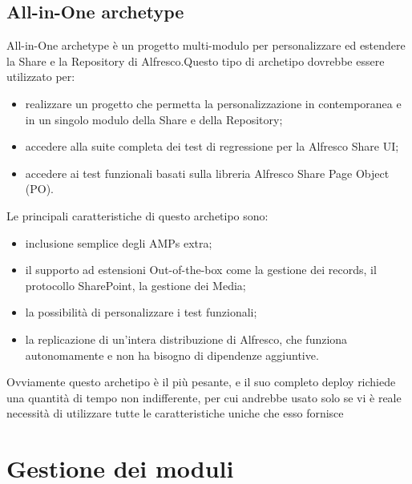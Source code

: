\subsection{All-in-One archetype}
All-in-One archetype è un progetto multi-modulo per personalizzare ed estendere la
Share e la Repository di Alfresco.Questo tipo di archetipo dovrebbe essere utilizzato per:
\begin{itemize}
\item realizzare un progetto che permetta la personalizzazione in contemporanea e in un singolo modulo della Share e della
Repository;
\item accedere alla suite completa dei test di regressione per la Alfresco Share UI;
\item accedere ai test funzionali basati sulla libreria Alfresco Share Page Object (PO).
\end{itemize}
Le principali caratteristiche di questo archetipo sono:
\begin{itemize}
\item inclusione semplice degli AMPs extra;
\item il supporto ad estensioni Out-of-the-box come la gestione dei records, il protocollo SharePoint, la
gestione dei Media;
\item la possibilità di personalizzare i test funzionali;
\item la replicazione di un'intera distribuzione di Alfresco, che funziona autonomamente e non ha bisogno di dipendenze aggiuntive.
\end{itemize}
Ovviamente questo archetipo è il più pesante, e il suo completo deploy richiede una quantità di tempo non indifferente, per cui andrebbe usato solo se vi è reale necessità di utilizzare tutte le caratteristiche uniche che esso fornisce
\section{Gestione dei moduli}
